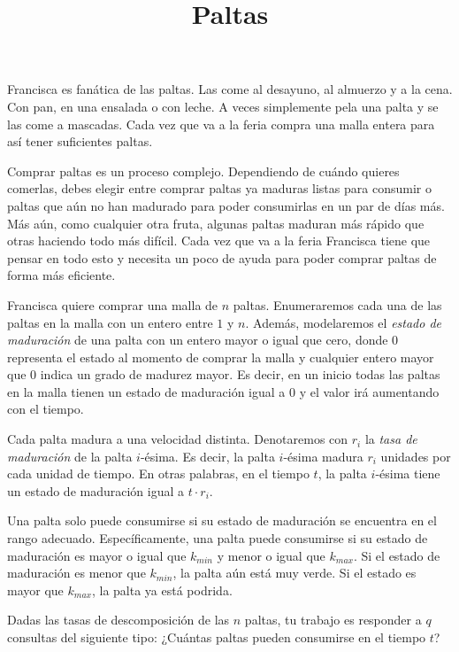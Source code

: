 \documentclass{oci}
\title{Paltas}
\begin{document}
\begin{problemDescription}
Francisca es fanática de las paltas.
Las come al desayuno, al almuerzo y a la cena.
Con pan, en una ensalada o con leche.
A veces simplemente pela una palta y se las come a mascadas.
Cada vez que va a la feria compra una malla entera para así tener suficientes paltas.

Comprar paltas es un proceso complejo.
Dependiendo de cuándo quieres comerlas, debes elegir entre comprar paltas ya maduras
listas para consumir o paltas que aún no han madurado para poder consumirlas
en un par de días más.
Más aún, como cualquier otra fruta, algunas paltas maduran más rápido que otras haciendo
todo más difícil.
Cada vez que va a la feria Francisca tiene que pensar en todo esto y necesita un poco de ayuda
para poder comprar paltas de forma más eficiente.

Francisca quiere comprar una malla de $n$ paltas.
Enumeraremos cada una de las paltas en la malla con un entero entre $1$ y $n$.
Además, modelaremos el \emph{estado de maduración} de una palta con un entero mayor o igual que cero,
donde 0 representa el estado al momento de comprar la malla y cualquier entero mayor que 0
indica un grado de madurez mayor.
Es decir, en un inicio todas las paltas en la malla tienen un estado de maduración igual a 0 y
el valor irá aumentando con el tiempo.

Cada palta madura a una velocidad distinta.
Denotaremos con $r_i$ la \emph{tasa de maduración} de la palta $i$-ésima.
Es decir, la palta $i$-ésima madura $r_i$ unidades por cada unidad de tiempo.
En otras palabras, en el tiempo $t$, la palta $i$-ésima tiene un estado de maduración
igual a $t \cdot r_i$.

Una palta solo puede consumirse si su estado de maduración se encuentra en el rango adecuado.
Específicamente, una palta puede consumirse si su estado de maduración es mayor o igual que
$k_{min}$ y menor o igual que $k_{max}$.
Si el estado de maduración es menor que $k_{min}$, la palta aún está muy verde.
Si el estado es mayor que $k_{max}$, la palta ya está podrida.

Dadas las tasas de descomposición de las $n$ paltas, tu trabajo es responder a $q$ consultas
del siguiente tipo:
¿Cuántas paltas pueden consumirse en el tiempo $t$?
\end{problemDescription}
\end{document}
